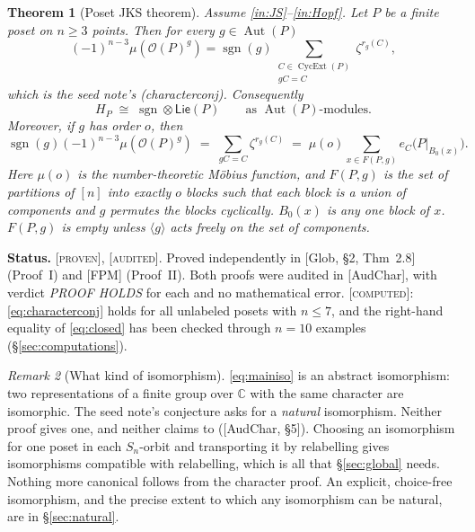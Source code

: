 \documentclass[11pt]{article}
\newtheorem{theorem}{Theorem}[section]
\theoremstyle{definition}
\theoremstyle{remark}
\newtheorem{remark}[theorem]{Remark}
\newcommand{\OP}{\mathcal O}
\newcommand{\Aut}{\operatorname{Aut}}
\newcommand{\Cyc}{\operatorname{CycExt}}
\newcommand{\sgn}{\operatorname{sgn}}
\newcommand{\PLie}{\mathsf{Lie}}
\newcommand{\st}[1]{\textup{[\textsc{#1}]}}
\begin{document}
\begin{theorem}[Poset JKS theorem]\label{thm:main}
Assume \ref{in:JS}--\ref{in:Hopf}. Let $P$ be a finite poset on $n\ge3$
points. Then for every $g\in\Aut(P)$
\begin{equation}\label{eq:characterconj}
(-1)^{n-3}\mu(\OP(P)^g)=\sgn(g)\sum_{\substack{C\in\Cyc(P)\\gC=C}}\zeta^{r_g(C)},
\end{equation}
which is the seed note's (characterconj). Consequently
\begin{equation}\label{eq:mainiso}
H_P\;\cong\;\sgn\otimes\PLie(P)\qquad\text{as }\Aut(P)\text{-modules}.
\end{equation}
Moreover, if $g$ has order $o$, then
\begin{equation}\label{eq:closed}
\sgn(g)(-1)^{n-3}\mu(\OP(P)^g)\;=\;\sum_{gC=C}\zeta^{r_g(C)}
\;=\;\mu(o)\sum_{x\in F(P,g)}e_C\bigl(P|_{B_0(x)}\bigr).
\end{equation}
Here $\mu(o)$ is the number-theoretic M\"obius function, and $F(P,g)$ is
the set of partitions of $[n]$ into exactly $o$ blocks such that each block
is a union of components and $g$ permutes the blocks cyclically. $B_0(x)$ is
any one block of $x$. $F(P,g)$ is empty unless $\langle g\rangle$ acts
freely on the set of components.
\end{theorem}

\noindent\textbf{Status.} \st{proven}, \st{audited}. Proved independently in
[Glob, \S2, Thm~2.8] (Proof~I) and [FPM] (Proof~II). Both proofs were
audited in [AudChar], with verdict \emph{PROOF HOLDS} for each and no
mathematical error. \st{computed}: \eqref{eq:characterconj} holds for all
unlabeled posets with $n\le7$, and the right-hand equality of
\eqref{eq:closed} has been checked through $n=10$ examples
(\S\ref{sec:computations}).

\begin{remark}[What kind of isomorphism]\label{rem:abstract}
\eqref{eq:mainiso} is an abstract isomorphism: two representations of a
finite group over $\mathbb C$ with the same character are isomorphic. The
seed note's conjecture asks for a \emph{natural} isomorphism. Neither proof
gives one, and neither claims to ([AudChar, \S5]). Choosing an isomorphism
for one poset in each $S_n$-orbit and transporting it by relabelling gives
isomorphisms compatible with relabelling, which is all that
\S\ref{sec:global} needs. Nothing more canonical follows from the character
proof. An explicit, choice-free isomorphism, and the precise extent to which
any isomorphism can be natural, are in \S\ref{sec:natural}.
\end{remark}
\end{document}
